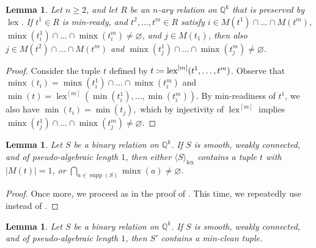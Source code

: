 \documentclass[a4paper,reqno, cleveref]{amsart}
\newcommand{\coloneqq}{\mathrel{\mathop:}\mathrel{\mkern-1.2mu}=}
\newtheorem{lemma}[theorem]{Lemma}
\newcommand{\Q}{\mathbb{Q}}
\DeclareMathOperator{\supp}{supp}
\DeclareMathOperator{\lex}{lex}
\DeclareMathOperator{\minx}{minx}
\newcommand{\nested}[2]{{#1^{[#2]}}}
\newcommand{\genrel}[2]{\langle{#1}\rangle_{#2}}
\begin{document}
\begin{lemma}\label{l:int1hyp}
Let $n \geq 2$, and let $R$ be an $n$-ary relation on $\Q^k$ that is preserved by $\lex$. If $t^1 \in R$ is  min-ready, and $t^2, \dots, t^{m} \in R$ satisfy $i \in M(t^1) \cap \dots \cap M(t^{m}),$ $\minx(t^1_i) \cap \dots \cap \minx( t^{m}_i )\neq \varnothing  $, and $j\in M(t_1)$, then also $j \in M(t^2)\cap\dots\cap M(t^m)$ and $\minx(t^1_j) \cap \dots \cap \minx(t^{m}_j) \neq \varnothing.$   
\end{lemma}%
\begin{proof}
Consider the tuple $t$ defined by $t\coloneqq\nested{\lex}{m}(t^1, \dots, t^m)$. Observe that $\minx(t_i)=\minx(t^1_i) \cap \dots \cap \minx( t^{m}_i )$ and $\min(t)=\nested{\lex}{m}(\min(t^1_i),\dots,\min(t^m_i))$. By min-readiness of $t^1$, we also have $\min(t_i)=\min(t_j),$ which by injectivity of $\nested{\lex}{m}$ implies $\minx(t^1_j) \cap \dots \cap \minx(t^{m}_j) \neq \varnothing.$
\end{proof}

\begin{lemma}\label{lemma:lex:minx_int2}
Let $S$ be a binary relation on $\Q^k$. If $S$ is smooth, weakly connected, and of pseudo-algebraic length $1$, then either $\genrel{S}{\lex}$ contains a tuple $t$ with $|M(t)|=1$, or  
     $\bigcap_{a\in \supp(S)}\minx(a)\neq\varnothing$.
\end{lemma}
%
\begin{proof}
   Once more, we proceed as in the proof of . This time, we repeatedly use   instead of .
\end{proof}

\begin{lemma}\label{lemma:lex:minclean}
Let $S$ be a binary relation on $\Q^k$. If $S$ is smooth, weakly connected, and of pseudo-algebraic length $1$, then $S'$  contains a min-clean tuple.
%
\end{lemma}
\end{document}

